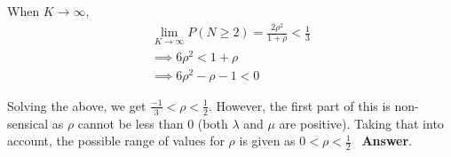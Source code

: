 When $K\to\infty$,
\begin{gather*}
\lim_{K\to\infty}P(N\ge2) = \frac{2\rho^2}{1 + \rho} < \frac{1}{3}\\
\implies 6\rho^2 < 1 + \rho\\
\implies 6\rho^2 - \rho - 1< 0
\end{gather*}

Solving the above, we get $\frac{-1}{3}<\rho<\frac{1}{2}$. However, the first part of this is non-sensical as $\rho$ cannot be less than 0 (both $\lambda$ and $\mu$ are positive). Taking that into account, the possible range of values for $\rho$ is given as $0 < \rho < \frac{1}{2}$ \ \textbf{Answer}.